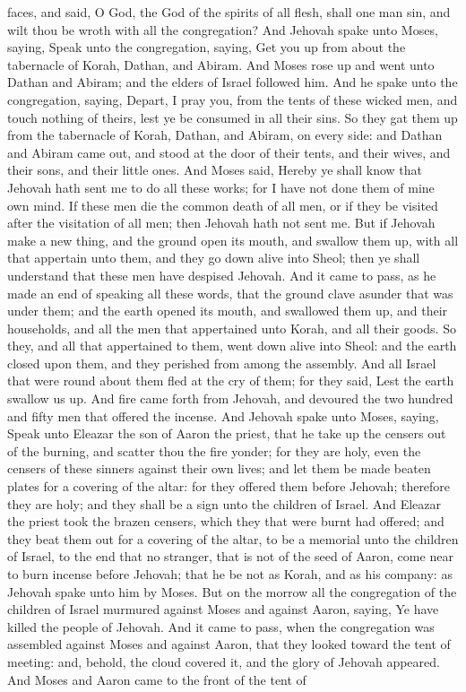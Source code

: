 faces, and said, O God, the God of the spirits of all flesh, shall one man sin, and wilt thou be wroth with all the congregation? And Jehovah spake unto Moses, saying, Speak unto the congregation, saying, Get you up from about the tabernacle of Korah, Dathan, and Abiram.  And Moses rose up and went unto Dathan and Abiram; and the elders of Israel followed him. And he spake unto the congregation, saying, Depart, I pray you, from the tents of these wicked men, and touch nothing of theirs, lest ye be consumed in all their sins. So they gat them up from the tabernacle of Korah, Dathan, and Abiram, on every side: and Dathan and Abiram came out, and stood at the door of their tents, and their wives, and their sons, and their little ones. And Moses said, Hereby ye shall know that Jehovah hath sent me to do all these works; for I have not done them of mine own mind. If these men die the common death of all men, or if they be visited after the visitation of all men; then Jehovah hath not sent me. But if Jehovah make a new thing, and the ground open its mouth, and swallow them up, with all that appertain unto them, and they go down alive into Sheol; then ye shall understand that these men have despised Jehovah.  And it came to pass, as he made an end of speaking all these words, that the ground clave asunder that was under them; and the earth opened its mouth, and swallowed them up, and their households, and all the men that appertained unto Korah, and all their goods. So they, and all that appertained to them, went down alive into Sheol: and the earth closed upon them, and they perished from among the assembly. And all Israel that were round about them fled at the cry of them; for they said, Lest the earth swallow us up. And fire came forth from Jehovah, and devoured the two hundred and fifty men that offered the incense.  And Jehovah spake unto Moses, saying, Speak unto Eleazar the son of Aaron the priest, that he take up the censers out of the burning, and scatter thou the fire yonder; for they are holy, even the censers of these sinners against their own lives; and let them be made beaten plates for a covering of the altar: for they offered them before Jehovah; therefore they are holy; and they shall be a sign unto the children of Israel. And Eleazar the priest took the brazen censers, which they that were burnt had offered; and they beat them out for a covering of the altar, to be a memorial unto the children of Israel, to the end that no stranger, that is not of the seed of Aaron, come near to burn incense before Jehovah; that he be not as Korah, and as his company: as Jehovah spake unto him by Moses.  But on the morrow all the congregation of the children of Israel murmured against Moses and against Aaron, saying, Ye have killed the people of Jehovah. And it came to pass, when the congregation was assembled against Moses and against Aaron, that they looked toward the tent of meeting: and, behold, the cloud covered it, and the glory of Jehovah appeared. And Moses and Aaron came to the front of the tent of 
